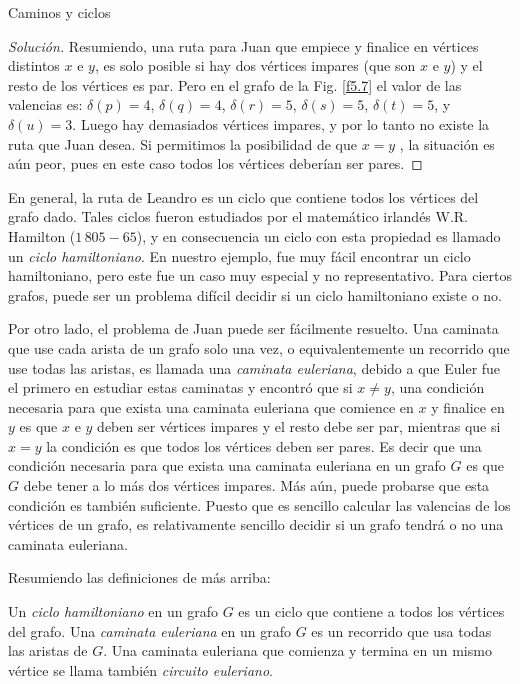 \begin{section}{Caminos y ciclos}
\begin{ejemplo}
\begin{proof}[Solución]
    Resumiendo, una ruta para Juan que empiece y finalice en vértices distintos $x$ e $y$, es solo posible si hay dos vértices impares (que son $x$ e $y$) y el resto de los vértices es par.  Pero en el grafo de la Fig. \ref{f5.7} el valor de las valencias es: $\delta(p)=4$, $\delta(q)=4$, $\delta(r)=5$, $\delta(s)=5$, $\delta(t)=5$, y $\delta(u)=3$. Luego hay demasiados vértices impares, y por lo tanto no existe la ruta que Juan desea. Si permitimos la posibilidad de que $x=y$ , la situación es aún peor, pues en este caso todos los vértices deberían ser pares.
\end{proof}
\end{ejemplo}

En general, la ruta de Leandro es un ciclo que contiene todos los vértices del grafo dado. Tales ciclos fueron estudiados por el matemático irlandés W.R. Hamilton ($1\,805-65$),   y en consecuencia un ciclo con esta propiedad es llamado un \textit{ciclo hamiltoniano}. En nuestro ejemplo, fue muy fácil  encontrar un ciclo hamiltoniano, pero este fue un caso muy especial y no representativo. Para ciertos grafos, puede ser un problema difícil decidir si un ciclo hamiltoniano existe o no.

Por otro lado, el problema de Juan puede ser fácilmente resuelto. Una caminata que use cada arista de un grafo solo una vez, o equivalentemente un recorrido que use todas las aristas, es llamada una \textit{caminata euleriana}, debido a que Euler  fue el primero en estudiar estas caminatas y encontró que si $x\not= y$, una condición necesaria para que exista una caminata euleriana que comience en $x$ y finalice en $y$ es que $x$ e $y$ deben ser vértices impares y el resto debe ser par, mientras que si $x=y$ la condición es que todos los vértices deben ser pares. Es decir que una condición necesaria para que exista una caminata euleriana en un grafo $G$
es que $G$ debe tener a lo más dos vértices impares. Más aún, puede probarse que esta condición es también suficiente. Puesto que es sencillo calcular las valencias de los vértices de un grafo, es relativamente sencillo decidir si un grafo tendrá o no una caminata euleriana. 

Resumiendo las definiciones de más arriba:

\begin{definicion}
Un \textit{ciclo hamiltoniano} en un grafo $G$ es un ciclo que contiene a todos los vértices del grafo. Una \textit{caminata euleriana} en un grafo $G$ es un recorrido que usa todas las aristas de $G$. Una caminata euleriana que comienza y termina en un mismo vértice se llama también \textit{circuito euleriano}.
\end{definicion}


\end{section}

